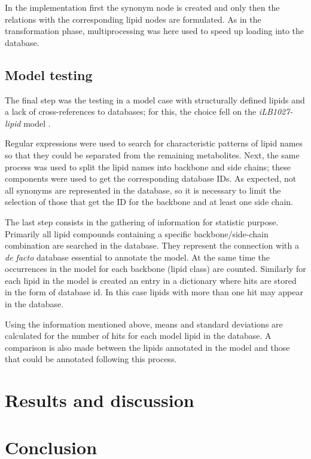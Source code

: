 \documentclass{llncs}
\begin{document}
In the implementation first the synonym node is created and only then the relations with the corresponding lipid nodes are formulated.
As in the transformation phase, multiprocessing was here used to speed up loading into the database.

\subsection{Model testing}

The final step was the testing in a model case with structurally defined lipids and a lack of cross-references to databases; for this, the choice fell on the \textit{iLB1027-lipid} model \cite{Levering2016}.

Regular expressions were used to search for characteristic patterns of lipid names so that they could be separated from the remaining metabolites.
Next, the same process was used to split the lipid names into backbone and side chains; these components were used to get the corresponding database IDs. 
As expected, not all synonyms are represented in the database, so it is necessary to limit the selection of those that get the ID for the backbone and at least one side chain.


The last step consists in the gathering of information for statistic purpose. Primarily all lipid compounds containing a specific backbone/side-chain combination are searched in the database. They represent the connection with a \textit{de facto} database essential to annotate the model. At the same time the occurrences in the model for each backbone (lipid class) are counted. Similarly for each lipid in the model is created an entry in a dictionary where hits are stored in the form of database id. In this case lipids with more than one hit may appear in the database. 

Using the information mentioned above, means and standard deviations are calculated for the number of hits for each model lipid in the database. A comparison is also made between the lipids annotated in the model and those that could be annotated following this process. 





\section{Results and discussion}

\section{Conclusion}





\end{document}
